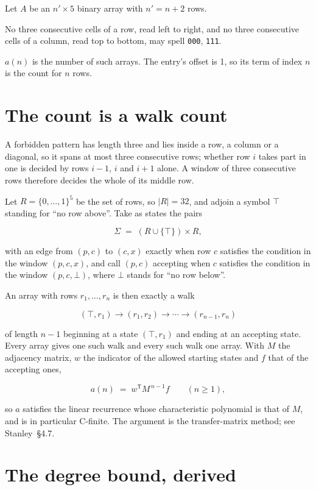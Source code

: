 \documentclass[11pt]{article}
\theoremstyle{definition}
\begin{document}
Let $A$ be an $n' \times 5$ binary array with $n' = n + 2$ rows.

No three consecutive cells of a row, read left to right, and no three consecutive cells of a column, read top to bottom, may spell \texttt{000}, \texttt{111}.

$a(n)$ is the number of such arrays. The entry's offset is 1, so its term of index $n$ is the count for $n$ rows.

\section{The count is a walk count}

A forbidden pattern has length three and lies inside a row, a column or a diagonal, so it spans at most three consecutive rows; whether row $i$ takes part in one is decided by rows $i-1$, $i$ and $i+1$ alone. A window of three consecutive rows therefore decides the whole of its middle row.

Let $R = \{0,\dots,1\}^{5}$ be the set of rows, so $|R| = 32$, and adjoin a symbol $\top$ standing for ``no row above''. Take as states the pairs

\[\Sigma \;=\; (R \cup \{\top\}) \times R,\]

with an edge from $(p,c)$ to $(c,x)$ exactly when row $c$ satisfies the condition in the window $(p,c,x)$, and call $(p,c)$ accepting when $c$ satisfies the condition in the window $(p,c,\bot)$, where $\bot$ stands for ``no row below''.

An array with rows $r_1,\dots,r_n$ is then exactly a walk

\[(\top,r_1) \to (r_1,r_2) \to \cdots \to (r_{n-1},r_n)\]

of length $n-1$ beginning at a state $(\top,r_1)$ and ending at an accepting state. Every array gives one such walk and every such walk one array. With $M$ the adjacency matrix, $w$ the indicator of the allowed starting states and $f$ that of the accepting ones,

\[a(n) \;=\; w^{\mathsf T} M^{\,n-1} f \qquad (n \ge 1),\]

so $a$ satisfies the linear recurrence whose characteristic polynomial is that of $M$, and is in particular C-finite. The argument is the transfer-matrix method; see Stanley~\S4.7.

\section{The degree bound, derived}
\end{document}
